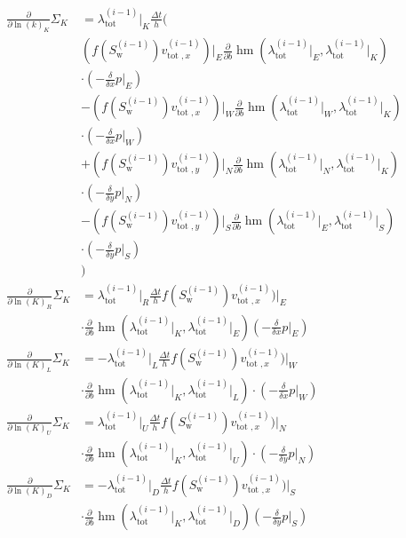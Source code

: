 \documentclass[conference]{IEEEtran}
\newcommand*{\pdiff}[2]{\ensuremath{\frac{\partial}{\partial{#2}}{#1}}}
\newcommand*{\ddiff}[2]{\ensuremath{\frac{\delta}{\delta{#2}}{#1}}}
\DeclareMathOperator*{\hmean}{hm}
\begin{document}
\begin{align}
\pdiff{\Sigma_K}{\ln(k)_K} &= \lambda_{\text{tot}}^{(i-1)}\lvert_K \frac{\Delta t}{h} \biggr(\\&(f(S_\text{w}^{(i-1)})v_{\text{tot }, x}^{(i-1)})\lvert_E\pdiff{\hmean}{b}(\lambda_\text{tot}^{(i-1)}\lvert_E, \lambda_\text{tot}^{(i-1)}\lvert_K) \nonumber\\&\cdot(-\ddiff{p}{x}\rvert_E)  \nonumber\\&- (f(S_\text{w}^{(i-1)})v_{\text{tot }, x}^{(i-1)})\lvert_W\pdiff{\hmean}{b}(\lambda_\text{tot}^{(i-1)}\lvert_W, \lambda_\text{tot}^{(i-1)}\lvert_K)\nonumber\\&\cdot(-\ddiff{p}{x}\rvert_W) \nonumber\\&+ (f(S_\text{w}^{(i-1)})v_{\text{tot }, y}^{(i-1)})\lvert_N\pdiff{\hmean}{b}(\lambda_\text{tot}^{(i-1)}\lvert_N, \lambda_\text{tot}^{(i-1)}\lvert_K)\nonumber\\&\cdot(-\ddiff{p}{y}\rvert_N)\nonumber\\&- (f(S_\text{w}^{(i-1)})v_{\text{tot }, y}^{(i-1)})\lvert_S\pdiff{\hmean}{b}(\lambda_\text{tot}^{(i-1)}\lvert_E, \lambda_\text{tot}^{(i-1)}\lvert_S)\nonumber\\&\cdot(-\ddiff{p}{y}\rvert_S)\nonumber\\&\biggr) \nonumber \\
\pdiff{\Sigma_K}{\ln(K)_R} &= \lambda_{\text{tot}}^{(i-1)}\lvert_R \frac{\Delta t}{h} f(S_\text{w}^{(i-1)})v_{\text{tot }, x}^{(i-1)})\lvert_E\nonumber\\&\cdot\pdiff{\hmean}{b}(\lambda_\text{tot}^{(i-1)}\lvert_K, \lambda_\text{tot}^{(i-1)}\lvert_E)(-\ddiff{p}{x}\rvert_E)\\
\pdiff{\Sigma_K}{\ln(K)_L} &= -\lambda_{\text{tot}}^{(i-1)}\lvert_L\frac{\Delta t}{h} f(S_\text{w}^{(i-1)})v_{\text{tot }, x}^{(i-1)})\lvert_W\nonumber\\&\cdot\pdiff{\hmean}{b}(\lambda_\text{tot}^{(i-1)}\lvert_K, \lambda_\text{tot}^{(i-1)}\lvert_L)\cdot(-\ddiff{p}{x}\rvert_W)\\
\pdiff{\Sigma_K}{\ln(K)_U} &= \lambda_{\text{tot}}^{(i-1)}\lvert_U \frac{\Delta t}{h} f(S_\text{w}^{(i-1)})v_{\text{tot }, x}^{(i-1)})\lvert_N\nonumber\\&\cdot\pdiff{\hmean}{b}(\lambda_\text{tot}^{(i-1)}\lvert_K, \lambda_\text{tot}^{(i-1)}\lvert_U)\cdot(-\ddiff{p}{y}\rvert_N)\\
\pdiff{\Sigma_K}{\ln(K)_D} &= -\lambda_{\text{tot}}^{(i-1)}\lvert_D\frac{\Delta t}{h} f(S_\text{w}^{(i-1)})v_{\text{tot }, x}^{(i-1)})\lvert_S\nonumber\\&\cdot\pdiff{\hmean}{b}(\lambda_\text{tot}^{(i-1)}\lvert_K, \lambda_\text{tot}^{(i-1)}\lvert_D)(-\ddiff{p}{y}\rvert_S)
\end{align}





\end{document}
